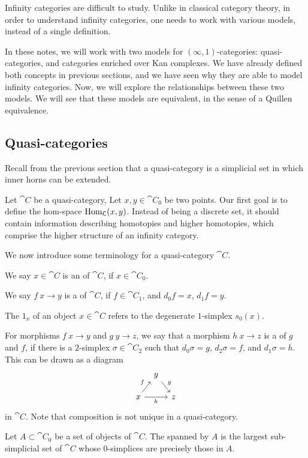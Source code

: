 Infinity categories are difficult to study.
Unlike in classical category theory,
in order to understand infinity categories,
one needs to work with various models, instead of a single definition.

In these notes, we will work with two models for $(\infty,1)$-categories:
quasi-categories, and categories enriched over Kan complexes.
We have already defined both concepts in previous sections,
and we have seen why they are able to model infinity categories.
Now, we will explore the relationships between these two models.
We will see that these models are equivalent,
in the sense of a Quillen equivalence.

\subsection{Quasi-categories}

Recall from the previous section that a quasi-category is a simplicial set in which
inner horns can be extended.

Let $\cat C$ be a quasi-category, 
Let $x,y\in\cat C_0$ be two points.
Our first goal is to define the hom-space $\operatorname{Hom}_{\mathsf{C}}(x,y)$.
Instead of being a discrete set, it should contain information
describing homotopies and higher homotopies, 
which comprise the higher structure of an infinity category.

We now introduce some terminology for
a quasi-category $\cat C$.
\begin{itms}
    \item We say $x\in\cat C$ is an  of $\cat C$, if $x\in\cat C_0$.
    \item We say $f\:x\to y$ is a  of $\cat C$, if $f\in\cat C_1$,
    and $d_0f=x$, $d_1f=y$.
    \item The  $1_x$ of an object $x\in\cat C$
    refers to the degenerate $1$-simplex $s_0(x)$.
    \item For morphisms $f\:x\to y$ and $g\:y\to z$,
    we say that a morphism $h\:x\to z$
    is a  of $g$ and $f$, if 
    there is a $2$-simplex $\sigma\in\cat C_2$ such that 
    $d_0\sigma=g$, $d_2\sigma=f$, and $d_1\sigma=h$.
    This can be drawn as a diagram
    \[\begin{tikzcd}[row sep=3ex,column sep=.7em]
        & y\ar[dr,"g"] \\
        x\ar[ur,"f"]\ar[rr,"h"'] && z
    \end{tikzcd}\]
    in $\cat C$. Note that composition is not unique in a quasi-category.
    \item Let $A\subset\cat{C}_0$ be a set of objects of $\cat{C}$.
    The  spanned by $A$ is
    the largest sub-simplicial set of $\cat{C}$ whose
    $0$-simplices are precisely those in $A$.
\end{itms}

